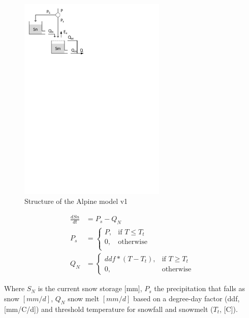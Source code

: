 { 																	%
\begin{figure}
\includegraphics[trim=1cm 22cm 9cm 1cm,width=7cm,keepaspectratio]{./AppA_files/06_schematic.pdf}
\caption{Structure of the Alpine model v1} \label{fig:06_schematic}
\end{figure}

\begin{align}
	\frac{dSn}{dt} &= P_s-Q_N \\
	P_s &= \begin{cases}
		P, &\text{if } T \leq T_t \\
		0, & \text{otherwise} \\
	\end{cases} \\
	Q_N &= 
	\begin{cases}
		ddf*(T - T_t), & \text{if } T \geq T_t \\
		0, & \text{otherwise}
	\end{cases}
\end{align}

Where $S_N$ is the current snow storage [mm], $P_s$ the precipitation that falls as snow $[mm/d]$, $Q_N$ snow melt $[mm/d]$ based on a degree-day factor (ddf, [mm/\degree C/d]) and threshold temperature for snowfall and snowmelt ($T_t$, [\degree C]).

}

